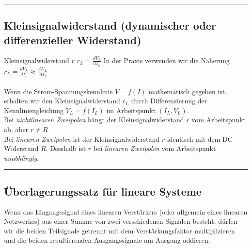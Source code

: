 \hrule
		
		\subsection{Kleinsignalwiderstand (dynamischer oder differenzieller
		Widerstand) }
			Kleinsignalwiderstand $r$ \hspace{15mm} $r_L=\frac{dV_L}{dI_L}$ In der Praxis
			verwenden wir die Näherung $r_L=\frac{dV_L}{dI_L}\approx \frac{\Delta
			V_L}{\Delta I_L}$\\ \\
			Wenn die Strom-Spannungskennlinie $V=f(I)$ mathematisch gegeben ist, erhalten
			wir den Kleinsignalwiderstand $r_L$ durch Differenzierung der
			Kennliniengleichung $V_L=f(I_L)$ im Arbeitspunkt $(I_L, V_L)$.\\
			Bei {\it nichtlinearen Zweipolen} hängt der Kleinsignalwiderstand $r$
			vom Arbeitspunkt ab, aber $r\neq R$\\
			Bei {\it linearen Zweipolen} ist der Kleinsignalwiderstand $r$
			identisch mit dem DC-Widerstand $R$. Desshalb ist $r$ bei {\it linearen
			Zweipolen} vom Arbeitspunkt {\it unabhängig}.\\
		
\hrule
		
		\subsection{Überlagerungssatz für lineare Systeme }
			Wenn das Eingangssignal eines linearen Verstärkers (oder allgemein eines
			linearen Netzwerkes) aus einer Summe von zwei verschiedenen Signalen besteht,
			dürfen wir die beiden Teilsignale getrennt mit dem Verstärkungsfaktor
			multiplizieren und die beiden resultierenden Ausgangssignale am Ausgang
			addieren.\\
			\hspace*{10mm}
			\\
	
